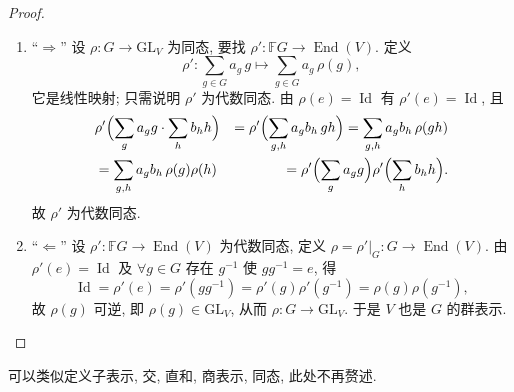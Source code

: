 \begin{proof}
\mbox{}\par\vspace{-0.2em}
\begin{enumerate}
\item ``$\Longrightarrow$'' 设 $\rho\colon G\to\mathrm{GL}_V$ 为同态, 要找 $\rho'\colon \mathbb{F}G\to\operatorname{End}(V)$.
定义
\begin{equation*}
  \rho'\colon\sum_{g\in G}a_g\,g\longmapsto\sum_{g\in G}a_g\,\rho(g),
\end{equation*}
它是线性映射; 只需说明 $\rho'$ 为代数同态. 由 $\rho(e)=\operatorname{Id}$ 有 $\rho'(e)=\operatorname{Id}$, 且
\[\begin{aligned}
  &\rho'\Bigl(\sum_{g}a_g g\cdot\sum_{h}b_h h\Bigr)
  &=\rho'\Bigl(\sum_{g,h}a_gb_h\,gh\Bigr)=\sum_{g,h}a_gb_h\,\rho(gh)\\
  &=\sum_{g,h}a_gb_h\,\rho(g)\rho(h)
  &=\rho'\Bigl(\sum_{g}a_g g\Bigr)\rho'\Bigl(\sum_{h}b_h h\Bigr).
\end{aligned}\]
故 $\rho'$ 为代数同态.

\item ``$\Longleftarrow$'' 设 $\rho'\colon \mathbb{F}G\to\operatorname{End}(V)$ 为代数同态, 定义 $\rho=\rho'|_G\colon G\to\operatorname{End}(V)$.
由 $\rho'(e)=\operatorname{Id}$ 及 $\forall g\in G$ 存在 $g^{-1}$ 使 $gg^{-1}=e$, 得
\begin{equation*}
  \operatorname{Id}=\rho'(e)=\rho'(gg^{-1})=\rho'(g)\rho'(g^{-1})=\rho(g)\rho(g^{-1}),
\end{equation*}
故 $\rho(g)$ 可逆, 即 $\rho(g)\in\mathrm{GL}_V$, 从而 $\rho\colon G\to\mathrm{GL}_V$. 于是 $V$ 也是 $G$ 的群表示.
\end{enumerate}
\end{proof}

\begin{remark}\label{rem:subrep}
可以类似定义子表示, 交, 直和, 商表示, 同态, 此处不再赘述.
\end{remark}

